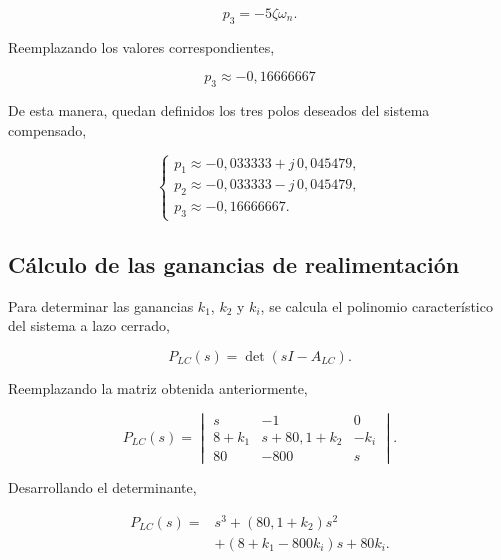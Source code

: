 \documentclass[10pt]{article}
\begin{document}
\begin{equation}
    p_3=-5\zeta\omega_n.
\end{equation}

Reemplazando los valores correspondientes,

\begin{equation}
    \boxed{
        p_3\approx-0{,}16666667
    }
\end{equation}

De esta manera, quedan definidos los tres polos
deseados del sistema compensado,

\begin{equation}
    \boxed{
        \begin{cases}
            p_1\approx-0{,}033333+j\,0{,}045479,\\
            p_2\approx-0{,}033333-j\,0{,}045479,\\
            p_3\approx-0{,}16666667.
        \end{cases}
    }
    \label{eq:ej10_polos}
\end{equation}


\subsection{Cálculo de las ganancias de realimentación}

Para determinar las ganancias $k_1$, $k_2$ y $k_i$,
se calcula el polinomio característico del sistema
a lazo cerrado,

\begin{equation}
    P_{LC}(s)=\det(sI-A_{LC}).
\end{equation}

Reemplazando la matriz obtenida anteriormente,

\begin{equation}
    P_{LC}(s)=
    \begin{vmatrix}
        s & -1 & 0\\
        8+k_1 & s+80{,}1+k_2 & -k_i\\
        80 & -800 & s
    \end{vmatrix}.
\end{equation}

Desarrollando el determinante,

\begin{equation}
    \begin{aligned}
        P_{LC}(s)={}&
        s^3+(80{,}1+k_2)s^2\\
        &+(8+k_1-800k_i)s+80k_i.
    \end{aligned}
\end{equation}
\end{document}
